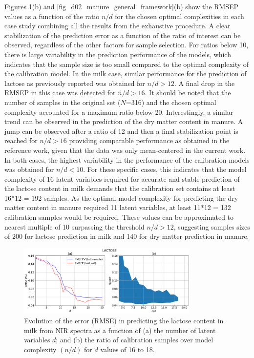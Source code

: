 \documentclass[journal=ancham,manuscript=article]{achemso}
\begin{document}
Figures \ref{fig_d01_milk_general_framework}(b) and \ref{fig_d02_manure_general_framework}(b) show the RMSEP values as a function of the ratio $n/d$ for the chosen optimal complexities in each case study combining all the results from the exhaustive procedure. A clear stabilization of the prediction error as a function of the ratio of interest can be observed, regardless of the other factors for sample selection. For ratios below 10, there is large variability in the prediction performance of the models, which indicates that the sample size is too small compared to the optimal complexity of the calibration model. In the milk case, similar performance for the prediction of lactose as previously reported \cite{Diaz-Olivares2020, Aernouts2011} was obtained for $n/d>12$. A final drop in the RMSEP in this case was detected for $n/d>16$. It should be noted that the number of samples in the original set ($N$=316) and the chosen optimal complexity accounted for a maximum ratio below 20. Interestingly, a similar trend can be observed in the prediction of the dry matter content in manure. A jump can be observed after a ratio of 12 and then a final stabilization point is reached for $n/d>16$ providing comparable performance as obtained in the reference work, given that the data was only mean-centered in the current work\cite{Saeys2005}. In both cases, the highest variability in the performance of the calibration models was obtained for $n/d<10$. For these specific cases, this indicates that the model complexity of 16 latent variables required for accurate and stable prediction of the lactose content in milk demands that the calibration set contains at least 16*12 = 192 samples. As the optimal model complexity for predicting the dry matter content in manure required 11 latent variables, at least 11*12 = 132 calibration samples would be required. These values can be approximated to nearest multiple of 10 surpassing the threshold $n/d>12$, suggesting samples sizes of 200 for lactose prediction in milk and 140 for dry matter prediction in manure.

\begin{figure}[b]
\includegraphics[width=0.8\textwidth]{manuscript/figures/d01_milk_general_framework.png}
\centering
\caption{Evolution of the error (RMSE) in predicting the lactose content in milk from NIR spectra as a function of (a) the number of latent variables $d$; and (b) the ratio of calibration samples over model complexity $(n/d)$ for $d$ values of 16 to 18.}
\label{fig_d01_milk_general_framework}
\end{figure}
\end{document}
